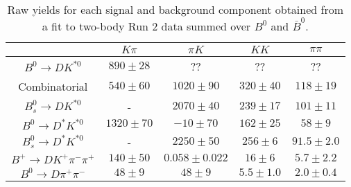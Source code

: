 \begin{table}
  \centering
  \begin{tabular}{ccccc}
      \toprule
       & $K\pi$ & $\pi K$ & $KK$ & $\pi\pi$ \\
      \midrule
      $B^0 \to DK^{*0}$ & $890 \pm 28$ & ?? & ?? & ?? \\
      Combinatorial & $540 \pm 60$ & $1020 \pm 90$ & $320 \pm 40$ & $118 \pm 19$ \\
      $B^0_s \to DK^{*0}$ & \-- & $2070 \pm 40$ & $239 \pm 17$ & $101 \pm 11$ \\
      $B^0 \to D^*K^{*0}$ & $1320 \pm 70$ & $-10 \pm 70$ & $162 \pm 25$ & $58 \pm 9$ \\
      $B^0_s \to D^*K^{*0}$ & \-- & $2250 \pm 50$ & $256 \pm 6$ & $91.5 \pm 2.0$ \\
      $B^+ \to DK^+\pi^-\pi^+$ & $140 \pm 50$ & $0.058 \pm 0.022$ & $16 \pm 6$ & $5.7 \pm 2.2$ \\
      $B^0 \to D\pi^+\pi^-$ & $48 \pm 9$ & $48 \pm 9$ & $5.5 \pm 1.0$ & $2.0 \pm 0.4$ \\
      \bottomrule
      \end{tabular}
  \caption{Raw yields for each signal and background component obtained from a fit to two-body Run 2 data summed over $B^0$ and $\bar{B}^0$.}
\label{tab:yields_combined_2body_run2}
\end{table}

